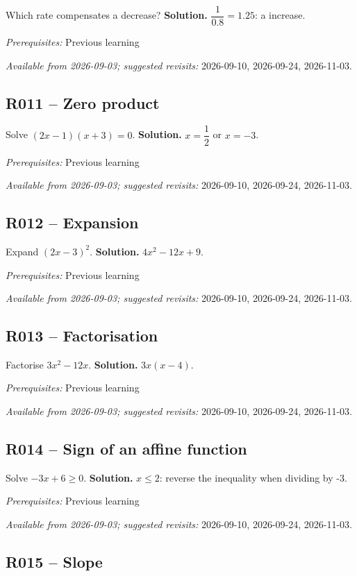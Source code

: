 Which rate compensates a  decrease?
\ifmxteacher\textbf{Solution.} $\dfrac{1}{\num{0,8}}=\num{1,25}$: a  increase.\par\textit{Prerequisites:} Previous learning\par\textit{Available from 2026-09-03; suggested revisits:} 2026-09-10, 2026-09-24, 2026-11-03.\fi
{}\subsection*{R011 -- Zero product}\label{R011}
Solve $(2x-1)(x+3)=0$.
\ifmxteacher\textbf{Solution.} $x=\dfrac{1}{2}$ or $x=-3$.\par\textit{Prerequisites:} Previous learning\par\textit{Available from 2026-09-03; suggested revisits:} 2026-09-10, 2026-09-24, 2026-11-03.\fi
{}\subsection*{R012 -- Expansion}\label{R012}
Expand $(2x-3)^2$.
\ifmxteacher\textbf{Solution.} $4x^2-12x+9$.\par\textit{Prerequisites:} Previous learning\par\textit{Available from 2026-09-03; suggested revisits:} 2026-09-10, 2026-09-24, 2026-11-03.\fi
{}\subsection*{R013 -- Factorisation}\label{R013}
Factorise $3x^2-12x$.
\ifmxteacher\textbf{Solution.} $3x(x-4)$.\par\textit{Prerequisites:} Previous learning\par\textit{Available from 2026-09-03; suggested revisits:} 2026-09-10, 2026-09-24, 2026-11-03.\fi
{}\subsection*{R014 -- Sign of an affine function}\label{R014}
Solve $-3x+6\geq0$.
\ifmxteacher\textbf{Solution.} $x\leq2$: reverse the inequality when dividing by -3.\par\textit{Prerequisites:} Previous learning\par\textit{Available from 2026-09-03; suggested revisits:} 2026-09-10, 2026-09-24, 2026-11-03.\fi
{}\subsection*{R015 -- Slope}\label{R015}
